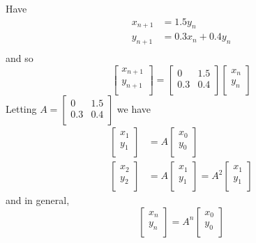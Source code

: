 \documentclass{article}
\begin{document}
\begin{example}
  Have
  \begin{align*}
    x_{n+1} & = 1.5y_n          \\
    y_{n+1} & = 0.3x_n + 0.4y_n \\
  \end{align*}
  and so \[
    \begin{bmatrix}
      x_{n+1} \\
      y_{n+1} \\
    \end{bmatrix} =
    \begin{bmatrix}
      0   & 1.5 \\
      0.3 & 0.4 \\
    \end{bmatrix}
    \begin{bmatrix}
      x_n \\y_n\\
    \end{bmatrix}
  \]
  Letting $A =
    \begin{bmatrix}
      0   & 1.5 \\
      0.3 & 0.4 \\
    \end{bmatrix}$ we have
  \begin{align*}
    \begin{bmatrix}
      x_1 \\y_1\\
    \end{bmatrix} & = A
    \begin{bmatrix}
      x_0 \\y_0\\
    \end{bmatrix}      \\
    \begin{bmatrix}
      x_2 \\y_2\\
    \end{bmatrix} & = A
    \begin{bmatrix}
      x_1 \\y_1\\
    \end{bmatrix} = A^2
    \begin{bmatrix}
      x_1 \\y_1\\
    \end{bmatrix}
  \end{align*} and in general, \[
    \begin{bmatrix}
      x_n \\y_n\\
    \end{bmatrix} = A^n
    \begin{bmatrix}
      x_0 \\y_0\\
    \end{bmatrix}
  \]


\end{example}
\end{document}

